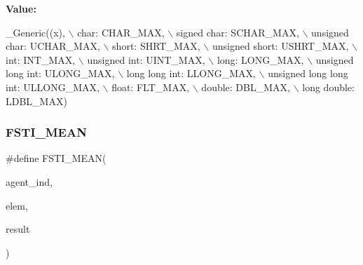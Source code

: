 {\bfseries Value\+:}
\begin{DoxyCode}
\_Generic((x),                                   \(\backslash\)
                                 \textcolor{keywordtype}{char}: CHAR\_MAX,                        \(\backslash\)
                                 \textcolor{keywordtype}{signed} \textcolor{keywordtype}{char}: SCHAR\_MAX,                \(\backslash\)
                                 \textcolor{keywordtype}{unsigned} \textcolor{keywordtype}{char}: UCHAR\_MAX,              \(\backslash\)
                                 \textcolor{keywordtype}{short}: SHRT\_MAX,                       \(\backslash\)
                                 \textcolor{keywordtype}{unsigned} \textcolor{keywordtype}{short}: USHRT\_MAX,             \(\backslash\)
                                 \textcolor{keywordtype}{int}: INT\_MAX,                          \(\backslash\)
                                 \textcolor{keywordtype}{unsigned} \textcolor{keywordtype}{int}: UINT\_MAX,                \(\backslash\)
                                 \textcolor{keywordtype}{long}: LONG\_MAX,                        \(\backslash\)
                                 \textcolor{keywordtype}{unsigned} \textcolor{keywordtype}{long} \textcolor{keywordtype}{int}: ULONG\_MAX,          \(\backslash\)
                                 \textcolor{keywordtype}{long} \textcolor{keywordtype}{long} \textcolor{keywordtype}{int}: LLONG\_MAX,              \(\backslash\)
                                 \textcolor{keywordtype}{unsigned} \textcolor{keywordtype}{long} \textcolor{keywordtype}{long} \textcolor{keywordtype}{int}: ULLONG\_MAX,    \(\backslash\)
                                 \textcolor{keywordtype}{float}: FLT\_MAX,                       \(\backslash\)
                                 \textcolor{keywordtype}{double}: DBL\_MAX,                      \(\backslash\)
                                 \textcolor{keywordtype}{long} \textcolor{keywordtype}{double}: LDBL\_MAX)
\end{DoxyCode}
\mbox{\label{fsti-report_8h_a56c545164f457022ec874321798f99af}} 
\subsubsection{\texorpdfstring{F\+S\+T\+I\+\_\+\+M\+E\+AN}{FSTI\_MEAN}}
{\footnotesize\ttfamily \#define F\+S\+T\+I\+\_\+\+M\+E\+AN(\begin{DoxyParamCaption}\item[{}]{agent\+\_\+ind,  }\item[{}]{elem,  }\item[{}]{result }\end{DoxyParamCaption})}

